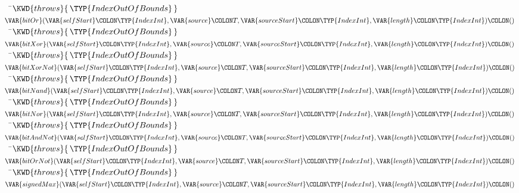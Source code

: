 \begin{Fortress}
{\tt~~}\pushtabs\=\+\(    \KWD{throws} \{\,\TYP{IndexOutOfBounds}\,\}\)\-\\\poptabs
\(  \VAR{bitOr}(\VAR{selfStart}\COLON \TYP{IndexInt}, \VAR{source}\COLON T, \VAR{sourceStart}\COLON \TYP{IndexInt}, \VAR{length}\COLON \TYP{IndexInt})\COLON ()\)\\
{\tt~~}\pushtabs\=\+\(    \KWD{throws} \{\,\TYP{IndexOutOfBounds}\,\}\)\-\\\poptabs
\(  \VAR{bitXor}(\VAR{selfStart}\COLON \TYP{IndexInt}, \VAR{source}\COLON T, \VAR{sourceStart}\COLON \TYP{IndexInt}, \VAR{length}\COLON \TYP{IndexInt})\COLON ()\)\\
{\tt~~}\pushtabs\=\+\(    \KWD{throws} \{\,\TYP{IndexOutOfBounds}\,\}\)\-\\\poptabs
\(  \VAR{bitXorNot}(\VAR{selfStart}\COLON \TYP{IndexInt}, \VAR{source}\COLON T, \VAR{sourceStart}\COLON \TYP{IndexInt}, \VAR{length}\COLON \TYP{IndexInt})\COLON ()\)\\
{\tt~~}\pushtabs\=\+\(    \KWD{throws} \{\,\TYP{IndexOutOfBounds}\,\}\)\-\\\poptabs
\(  \VAR{bitNand}(\VAR{selfStart}\COLON \TYP{IndexInt}, \VAR{source}\COLON T, \VAR{sourceStart}\COLON \TYP{IndexInt}, \VAR{length}\COLON \TYP{IndexInt})\COLON ()\)\\
{\tt~~}\pushtabs\=\+\(    \KWD{throws} \{\,\TYP{IndexOutOfBounds}\,\}\)\-\\\poptabs
\(  \VAR{bitNor}(\VAR{selfStart}\COLON \TYP{IndexInt}, \VAR{source}\COLON T, \VAR{sourceStart}\COLON \TYP{IndexInt}, \VAR{length}\COLON \TYP{IndexInt})\COLON ()\)\\
{\tt~~}\pushtabs\=\+\(    \KWD{throws} \{\,\TYP{IndexOutOfBounds}\,\}\)\-\\\poptabs
\(  \VAR{bitAndNot}(\VAR{selfStart}\COLON \TYP{IndexInt}, \VAR{source}\COLON T, \VAR{sourceStart}\COLON \TYP{IndexInt}, \VAR{length}\COLON \TYP{IndexInt})\COLON ()\)\\
{\tt~~}\pushtabs\=\+\(    \KWD{throws} \{\,\TYP{IndexOutOfBounds}\,\}\)\-\\\poptabs
\(  \VAR{bitOrNot}(\VAR{selfStart}\COLON \TYP{IndexInt}, \VAR{source}\COLON T, \VAR{sourceStart}\COLON \TYP{IndexInt}, \VAR{length}\COLON \TYP{IndexInt})\COLON ()\)\\
{\tt~~}\pushtabs\=\+\(    \KWD{throws} \{\,\TYP{IndexOutOfBounds}\,\}\)\-\\\poptabs
\(  \VAR{signedMax}(\VAR{selfStart}\COLON \TYP{IndexInt}, \VAR{source}\COLON T, \VAR{sourceStart}\COLON \TYP{IndexInt}, \VAR{length}\COLON \TYP{IndexInt})\COLON ()\)\\

\end{Fortress}
